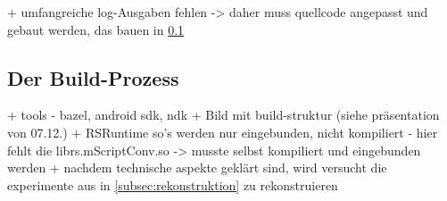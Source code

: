 + umfangreiche log-Ausgaben fehlen -> daher muss quellcode angepasst und gebaut werden, das bauen in \ref{subsec:buildprozess}

\subsection{Der Build-Prozess}
\label{subsec:buildprozess}
+ tools - bazel, android sdk, ndk
+ Bild mit build-struktur (siehe präsentation von 07.12.)
+ RSRuntime so's werden nur eingebunden, nicht kompiliert
	- hier fehlt die librs.mScriptConv.so -> musste selbst kompiliert und eingebunden werden
+ nachdem technische aspekte geklärt sind, wird versucht die experimente aus \cite{rstensorflow2017} in \ref{subsec:rekonstruktion} zu rekonstruieren 
